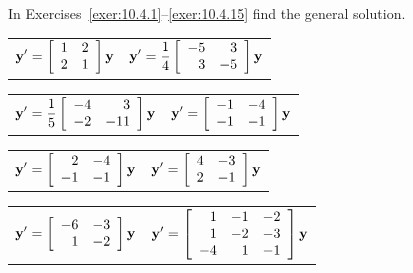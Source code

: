 \exercises In Exercises~\ref{exer:10.4.1}--\ref{exer:10.4.15} find the general solution.

\begin{exerciselist}
  \begin{tabular}[t]{@{}p{168pt}@{}p{168pt}}
    \item\label{exer:10.4.1} $\displaystyle{{\bf y}'= \left[\begin{array}{rr}1&2\\2&1\end{array}\right]{\bf y}}$ &
    \item\label{exer:10.4.2} $\displaystyle{{\bf y}'= \frac{1}{4}\left[\begin{array}{rr}-5&3\\3&-5\end{array}\right]{\bf y}}$
  \end{tabular}

  \begin{tabular}[t]{@{}p{168pt}@{}p{168pt}}
    \item\label{exer:10.4.3} $\displaystyle{{\bf y}'= \frac{1}{5}\left[\begin{array}{rr}-4&3\\ -2&-11\end{array}\right]{\bf y}}$ &
    \item\label{exer:10.4.4} $\displaystyle{{\bf y}'= \left[\begin{array}{rr}-1&-4\\-1&-1\end{array}\right]{\bf y}}$
  \end{tabular}

  \begin{tabular}[t]{@{}p{168pt}@{}p{168pt}}
    \item\label{exer:10.4.5} $\displaystyle{{\bf y}'= \left[\begin{array}{rr}2&-4\\-1&-1\end{array}\right]{\bf y}}$ &
    \item\label{exer:10.4.6} $\displaystyle{{\bf y}'= \left[\begin{array}{rr}4&-3\\2&-1\end{array}\right]{\bf y}}$
  \end{tabular}

  \begin{tabular}[t]{@{}p{168pt}@{}p{168pt}}
    \item\label{exer:10.4.7} $\displaystyle{{\bf y}'= \left[\begin{array}{rr}-6&-3\\1&-2\end{array}\right]{\bf y}}$ &
    \item\label{exer:10.4.8} $\displaystyle{{\bf y}'= \left[\begin{array}{rrr}1&-1&-2\\1&-2&-3\\-4&1&-1\end{array}\right] {\bf y}}$
  \end{tabular}


\end{exerciselist}
